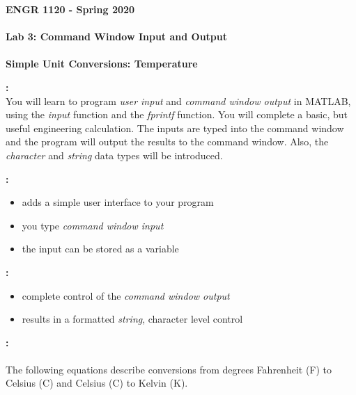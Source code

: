 \documentclass[11pt]{article}
\newcommand{\NUM}{3}
\begin{document}
	\textbf{\LARGE ENGR 1120 -  Spring 2020} \\\\
	\textbf{\LARGE Lab \NUM: Command Window Input and Output} \\\\
	\textbf{\LARGE Simple Unit Conversions: Temperature} \\
	
	
	\begin{description}
        \vspace{3mm}
		\item [\textbf{ \Large Overview}] \textbf{ \Large :}\\
			\Large
			You will learn to program {\it user input} and {\it command window output} in MATLAB, using the {\it input} function and the {\it fprintf} function. You will complete a basic, but useful engineering calculation. The inputs are typed into the command window and the program will output the results to the command window. Also, the {\it character} and {\it string} data types will be introduced. \\
			
 	\item [\textbf{ \Large the {\it input()} function}] \textbf{ \Large :}\\   
            	\Large
            	\begin{itemize}
            		\item adds a simple user interface to your program
            		\item you type {\it command window input} 
            		\item the input can be stored as a variable	
            	\end{itemize}
        \vspace{5mm}
            
        \item [\textbf{ \Large the {\it fprintf()} function}] \textbf{ \Large :}\\   
            	\Large
            	\begin{itemize}
            		\item complete control of the {\it command window output}	
            		\item results in a formatted {\it string}, character level control 
            	\end{itemize}
            \vspace{5mm}
 \item [\textbf{ \Large Temperature Conversions}] \textbf{ \Large :}\\ \\
            The following equations describe conversions from degrees Fahrenheit (F) to Celsius (C) and Celsius (C) to Kelvin (K).\\


\end{description}
\end{document}
